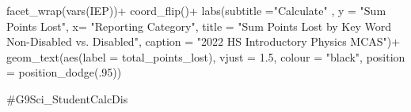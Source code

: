 \documentclass[
  letterpaper,
  DIV=11,
  numbers=noendperiod]{scrartcl}
\newenvironment{Shaded}{\begin{snugshade}}{\end{snugshade}}
\newcommand{\AttributeTok}[1]{\textcolor[rgb]{0.40,0.45,0.13}{#1}}
\newcommand{\CommentTok}[1]{\textcolor[rgb]{0.37,0.37,0.37}{#1}}
\newcommand{\DecValTok}[1]{\textcolor[rgb]{0.68,0.00,0.00}{#1}}
\newcommand{\FloatTok}[1]{\textcolor[rgb]{0.68,0.00,0.00}{#1}}
\newcommand{\FunctionTok}[1]{\textcolor[rgb]{0.28,0.35,0.67}{#1}}
\newcommand{\NormalTok}[1]{\textcolor[rgb]{0.00,0.23,0.31}{#1}}
\newcommand{\SpecialCharTok}[1]{\textcolor[rgb]{0.37,0.37,0.37}{#1}}
\newcommand{\StringTok}[1]{\textcolor[rgb]{0.13,0.47,0.30}{#1}}
\begin{document}
\begin{Shaded}
\begin{Highlighting}[]
  \FunctionTok{facet\_wrap}\NormalTok{(}\FunctionTok{vars}\NormalTok{(IEP))}\SpecialCharTok{+} \FunctionTok{coord\_flip}\NormalTok{()}\SpecialCharTok{+}
   \FunctionTok{labs}\NormalTok{(}\AttributeTok{subtitle =}\StringTok{"Calculate"}\NormalTok{ ,}
       \AttributeTok{y =} \StringTok{"Sum Points Lost"}\NormalTok{,}
       \AttributeTok{x=} \StringTok{"Reporting Category"}\NormalTok{,}
       \AttributeTok{title =} \StringTok{"Sum Points Lost by Key Word Non{-}Disabled vs. Disabled"}\NormalTok{,}
      \AttributeTok{caption =} \StringTok{"2022 HS Introductory Physics MCAS"}\NormalTok{)}\SpecialCharTok{+}
  \FunctionTok{geom\_text}\NormalTok{(}\FunctionTok{aes}\NormalTok{(}\AttributeTok{label =} \StringTok{\textasciigrave{}}\AttributeTok{total\_points\_lost}\StringTok{\textasciigrave{}}\NormalTok{), }\AttributeTok{vjust =} \FloatTok{1.5}\NormalTok{, }\AttributeTok{colour =} \StringTok{"black"}\NormalTok{, }\AttributeTok{position =} \FunctionTok{position\_dodge}\NormalTok{(.}\DecValTok{95}\NormalTok{))}

\CommentTok{\#G9Sci\_StudentCalcDis}
\end{Highlighting}
\end{Shaded}
\end{document}

